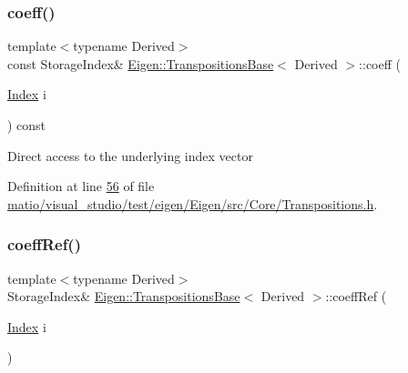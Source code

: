 \subsubsection{\texorpdfstring{coeff()}{coeff()}\hspace{0.1cm}{\footnotesize\ttfamily [2/2]}}
{\footnotesize\ttfamily template$<$typename Derived$>$ \\
const Storage\+Index\& \hyperlink{class_eigen_1_1_transpositions_base}{Eigen\+::\+Transpositions\+Base}$<$ Derived $>$\+::coeff (\begin{DoxyParamCaption}\item[{\hyperlink{class_eigen_1_1_transpositions_base_a3f5f06118b419e8e6ccbe49ed5b4c91f}{Index}}]{i }\end{DoxyParamCaption}) const\hspace{0.3cm}{\ttfamily [inline]}}

Direct access to the underlying index vector 

Definition at line \hyperlink{matio_2visual__studio_2test_2eigen_2_eigen_2src_2_core_2_transpositions_8h_source_l00056}{56} of file \hyperlink{matio_2visual__studio_2test_2eigen_2_eigen_2src_2_core_2_transpositions_8h_source}{matio/visual\+\_\+studio/test/eigen/\+Eigen/src/\+Core/\+Transpositions.\+h}.

\mbox{\label{class_eigen_1_1_transpositions_base_a97dda1bb4ff8bdd83d8e97af3e590252}} 
\subsubsection{\texorpdfstring{coeff\+Ref()}{coeffRef()}\hspace{0.1cm}{\footnotesize\ttfamily [1/2]}}
{\footnotesize\ttfamily template$<$typename Derived$>$ \\
Storage\+Index\& \hyperlink{class_eigen_1_1_transpositions_base}{Eigen\+::\+Transpositions\+Base}$<$ Derived $>$\+::coeff\+Ref (\begin{DoxyParamCaption}\item[{\hyperlink{class_eigen_1_1_transpositions_base_a3f5f06118b419e8e6ccbe49ed5b4c91f}{Index}}]{i }\end{DoxyParamCaption})\hspace{0.3cm}{\ttfamily [inline]}}

